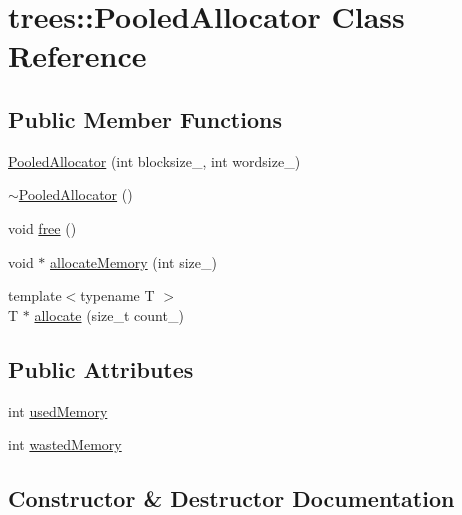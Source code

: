 \hypertarget{classtrees_1_1_pooled_allocator}{}\section{trees\+:\+:Pooled\+Allocator Class Reference}
\label{classtrees_1_1_pooled_allocator}
\subsection*{Public Member Functions}
\begin{DoxyCompactItemize}
\item 
\hyperlink{classtrees_1_1_pooled_allocator_ae03eae7a2d5ccfffc2263976538a325a}{Pooled\+Allocator} (int blocksize\+\_, int wordsize\+\_)
\item 
\hyperlink{classtrees_1_1_pooled_allocator_a02a16650ef941629896065e047542c9b}{$\sim$\+Pooled\+Allocator} ()
\item 
void \hyperlink{classtrees_1_1_pooled_allocator_a64a9e64fba5590513fa11ed5ff74e067}{free} ()
\item 
void $\ast$ \hyperlink{classtrees_1_1_pooled_allocator_a33b64cd726208d57d982d42a7e00e7a0}{allocate\+Memory} (int size\+\_\+)
\item 
{\footnotesize template$<$typename T $>$ }\\T $\ast$ \hyperlink{classtrees_1_1_pooled_allocator_af5bd259585b270d0c43a48c147835699}{allocate} (size\+\_\+t count\+\_)
\end{DoxyCompactItemize}
\subsection*{Public Attributes}
\begin{DoxyCompactItemize}
\item 
int \hyperlink{classtrees_1_1_pooled_allocator_a1c1fcdab76bfdd6c99e91ede846b36c4}{used\+Memory}
\item 
int \hyperlink{classtrees_1_1_pooled_allocator_a39f18ea897fadf1f81d006a853a4c0c0}{wasted\+Memory}
\end{DoxyCompactItemize}


\subsection{Constructor \& Destructor Documentation}
\mbox{\label{classtrees_1_1_pooled_allocator_ae03eae7a2d5ccfffc2263976538a325a}} 
